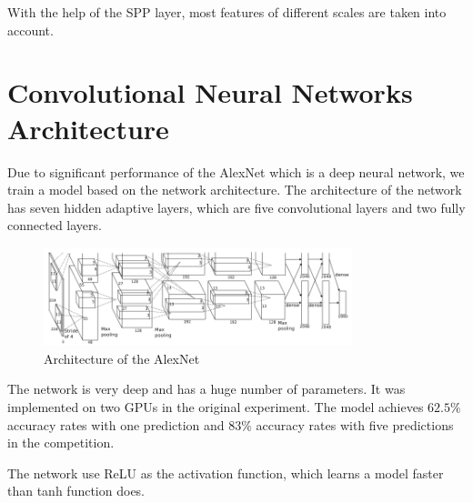 With the help of the SPP layer, most features of different scales are taken into account.

\section{Convolutional Neural Networks Architecture}

Due to significant performance of the AlexNet \citep{krizhevsky2012imagenet} which is a deep neural network, we train a model based on the network architecture. The architecture of the network has seven hidden adaptive layers, which are five convolutional layers and two fully connected layers.
\begin{figure}[htb]
    \centering
	\includegraphics[width=0.8\textwidth]{AlexNet.png}
    \caption{Architecture of the AlexNet \citep{krizhevsky2012imagenet}}%
    \label{fig:ImageNetArch}%
\end{figure}
The network is very deep and has a huge number of parameters. It was implemented on two GPUs in the original experiment. The model achieves $62.5\%$ accuracy rates with one prediction and $83\%$ accuracy rates with five predictions in the competition.

The network use ReLU \citep{nair2010rectified} as the activation function, which learns a model faster than tanh function does. 


